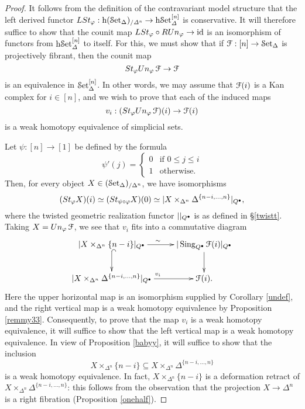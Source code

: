 \begin{proof}
It follows from the definition of the contravariant model structure that the left derived
functor $L St_{\varphi}: \rm{h} \it{(\operatorname{\mathcal{S}et_{\Delta}})_{/ \Delta^n } } \rightarrow \rm{h} \it{ \operatorname{\mathcal{S}et}_{\Delta}^{[n] }}$
is conservative. It will therefore suffice to show that the counit map
$L St_{\varphi} \circ R Un_{\varphi} \rightarrow \operatorname{id}$ is an isomorphism of functors
from $\rm{h} \it{ \operatorname{\mathcal{S}et}_{\Delta}^{[n]} }$ to itself. For this, we must show that if
$\operatorname{\mathcal{F}}: [n] \rightarrow \operatorname{\mathcal{S}et_{\Delta}}$ is projectively fibrant, then the counit map
$$ St_{\varphi} Un_{\varphi} \operatorname{\mathcal{F}} \rightarrow \operatorname{\mathcal{F}}$$
is an equivalence in $\operatorname{\mathcal{S}et}_{\Delta}^{[n]}$. In other words, we may assume that
$\operatorname{\mathcal{F}}(i)$ is a Kan complex for $i \in [n]$, and we wish to prove that
each of the induced maps
$$ v_i: (St_{\varphi} Un_{\varphi} \operatorname{\mathcal{F}})(i) \rightarrow \operatorname{\mathcal{F}}(i)$$
is a weak homotopy equivalence of simplicial sets. 

Let $\psi: [n] \rightarrow [1]$ be defined by the formula 
$$ \psi'(j) = \begin{cases} 0 & \text{if } 0 \leq j \leq i \\
1& \text{otherwise.} \end{cases}$$
Then, for every object $X \in (\operatorname{\mathcal{S}et_{\Delta}})_{/ \Delta^n }$, we have isomorphisms
$$ (St_{\varphi} X)(i) \simeq ( St_{\psi \circ \varphi} X)(0)
\simeq | X \times_{ \Delta^n } \Delta^{ \{n-i, \ldots, n \} } |_{Q^{\bullet}},$$ where
the twisted geometric realization functor $| |_{Q^{\bullet}}$ is as defined in \S \ref{twistt}.
Taking $X = Un_{\varphi} \operatorname{\mathcal{F}}$, we see that $v_i$ fits into a commutative diagram
$$ \xymatrix{ | X \times_{\Delta^n} \{n-i\} |_{Q^{\bigdot} } \ar[r]^{\sim} \ar@{^{(}->}[d]
& | \Sing_{Q^{\bigdot} } \calF(i) |_{Q^{\bigdot}} \ar[d] \\
| X \times_{\Delta^n} \Delta^{ \{n-i, \ldots, n\} } |_{Q^{\bigdot}} \ar[r]^{v_i} &
\calF(i). }$$
Here the upper horizontal map is an isomorphism supplied by Corollary \ref{undef}, 
and the right vertical map is a weak homotopy equivalence by Proposition \ref{remmy33}. Consequently, to prove that the map $v_i$ is a weak homotopy equivalence, it will suffice
to show that the left vertical map is a weak homotopy equivalence. In view of Proposition
\ref{babyy}, it will suffice to show that the inclusion
$$ X \times_{ \Delta^n } \{n-i\} \subseteq X \times_{ \Delta^n} \Delta^{ \{n-i, \ldots, n \} }$$
is a weak homotopy equivalence. In fact, $X \times_{ \Delta^n } \{n-i\}$ is a deformation
retract of $X \times_{ \Delta^n} \Delta^{ \{n-i, \ldots, n \} }$: this follows from
the observation that the projection $X \rightarrow \Delta^n$ is a right fibration
(Proposition \ref{onehalf}).
\end{proof}

